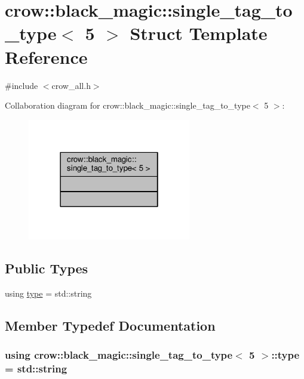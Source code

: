 \hypertarget{structcrow_1_1black__magic_1_1single__tag__to__type_3_015_01_4}{\section{crow\-:\-:black\-\_\-magic\-:\-:single\-\_\-tag\-\_\-to\-\_\-type$<$ 5 $>$ Struct Template Reference}
\label{structcrow_1_1black__magic_1_1single__tag__to__type_3_015_01_4}
}


{\ttfamily \#include $<$crow\-\_\-all.\-h$>$}



Collaboration diagram for crow\-:\-:black\-\_\-magic\-:\-:single\-\_\-tag\-\_\-to\-\_\-type$<$ 5 $>$\-:
\nopagebreak
\begin{figure}[H]
\begin{center}
\leavevmode
\includegraphics[width=202pt]{structcrow_1_1black__magic_1_1single__tag__to__type_3_015_01_4__coll__graph}
\end{center}
\end{figure}
\subsection*{Public Types}
\begin{DoxyCompactItemize}
\item 
using \hyperlink{structcrow_1_1black__magic_1_1single__tag__to__type_3_015_01_4_ad53ca85dec2074626b9c59bdbfc3ca8c}{type} = std\-::string
\end{DoxyCompactItemize}


\subsection{Member Typedef Documentation}
\hypertarget{structcrow_1_1black__magic_1_1single__tag__to__type_3_015_01_4_ad53ca85dec2074626b9c59bdbfc3ca8c}{
\subsubsection[{type}]{\setlength{\rightskip}{0pt plus 5cm}using {\bf crow\-::black\-\_\-magic\-::single\-\_\-tag\-\_\-to\-\_\-type}$<$ 5 $>$\-::{\bf type} =  std\-::string}}\label{structcrow_1_1black__magic_1_1single__tag__to__type_3_015_01_4_ad53ca85dec2074626b9c59bdbfc3ca8c}


